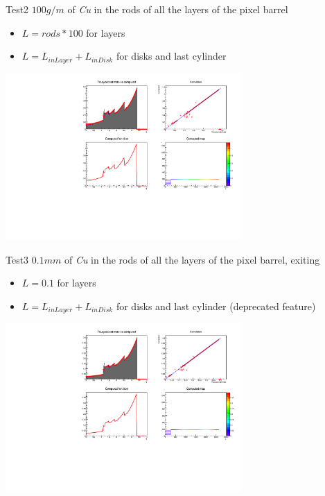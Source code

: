 \documentclass[pdftex, 11pt]{beamer}
\begin{document}
\begin{frame}
  \begin{block}{Test2}
    \alert{$100 g/m$} of \emph{Cu}  in the rods of all the layers of the pixel barrel
    \begin{itemize}
    \item \alert{$L=rods*100$} for layers
    \item \alert{$L=L_{inLayer}+L_{inDisk}$} for disks and last cylinder
    \end{itemize}
  \end{block}
  \begin{center}
    \includegraphics[width=9cm]{img/test2.pdf}
  \end{center}
\end{frame}

\begin{frame}
  \begin{block}{Test3}
    \alert{$0.1 mm$} of \emph{Cu}  in the rods of all the layers of the pixel barrel, exiting
    \begin{itemize}
    \item \alert{$L=0.1$} for layers
    \item \alert{$L=L_{inLayer}+L_{inDisk}$} for disks and last cylinder (\alert{deprecated feature})
    \end{itemize}
  \end{block}
  \begin{center}
    \includegraphics[width=9cm]{img/test3.pdf}
  \end{center}
\end{frame}
\end{document}

